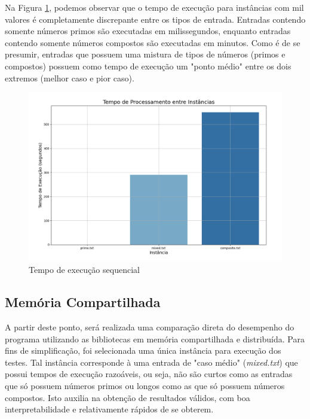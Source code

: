 \documentclass[a4paper, 12pt]{article}
\begin{document}
Na Figura \ref{fig:map4}, podemos observar que o tempo de execução para instâncias com mil valores é completamente discrepante entre os tipos de entrada. Entradas contendo somente números primos são executadas em milissegundos, enquanto entradas contendo somente números compostos são executadas em minutos. Como é de se presumir, entradas que possuem uma mistura de tipos de números (primos e compostos) possuem como tempo de execução um "ponto médio" \hspace{0.1cm}entre os dois extremos (melhor caso e pior caso).

\vspace*{-0.5cm}
\begin{figure}[H]
    \centering
    \includegraphics[width=1\textwidth]{Images/sequential.png}
    \vspace*{-1cm}
    \caption{Tempo de execução sequencial}
    \label{fig:map4}
\end{figure}

\subsection{Memória Compartilhada}

A partir deste ponto, será realizada uma comparação direta do desempenho do programa utilizando as bibliotecas em memória compartilhada e distribuída. Para fins de simplificação, foi selecionada uma única instância para execução dos testes. Tal instância corresponde à uma entrada de "caso médio" \hspace{0.1cm}(\emph{mixed.txt}) que possui tempos de execução razoáveis, ou seja, não são curtos como as entradas que só possuem números primos ou longos como as que só possuem números compostos. Isto auxilia na obtenção de resultados válidos, com boa interpretabilidade e relativamente rápidos de se obterem.
\end{document}
